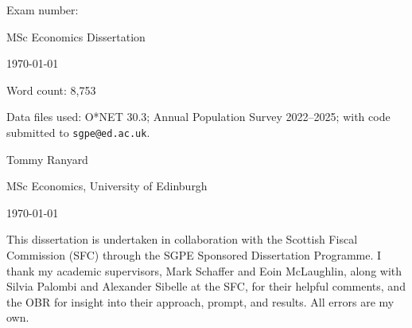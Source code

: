 


\begin{titlepage}
\centering
\vspace*{2cm}
{\LARGE\bfseries \thetitle \par}
\vspace{2cm}

\ifanonymous
  {\large Exam number: \examnumber \par}
  \vspace{0.5em}
  {\large MSc Economics Dissertation \par}
  \vspace{0.5em}
  {\large \today \par}
  \vspace{2cm}
  {\normalsize Word count: 8,753 \par}
  \vspace{1em}
  {\normalsize Data files used: O*NET 30.3; Annual Population Survey 2022--2025; with code submitted to \texttt{sgpe@ed.ac.uk}. \par}
\else
  {\large Tommy Ranyard \par}
  \vspace{0.5em}
  {\large MSc Economics, University of Edinburgh \par}
  \vspace{0.5em}
  {\large \today \par}
  \vspace{2cm}
  \begin{minipage}{0.85\textwidth}
  \small
  This dissertation is undertaken in collaboration with the Scottish Fiscal Commission (SFC) through the SGPE Sponsored Dissertation Programme. I thank my academic supervisors, Mark Schaffer and Eoin McLaughlin, along with Silvia Palombi and Alexander Sibelle at the SFC, for their helpful comments, and the OBR for insight into their approach, prompt, and results. All errors are my own.
  \end{minipage}
\fi

\vfill
\end{titlepage}

